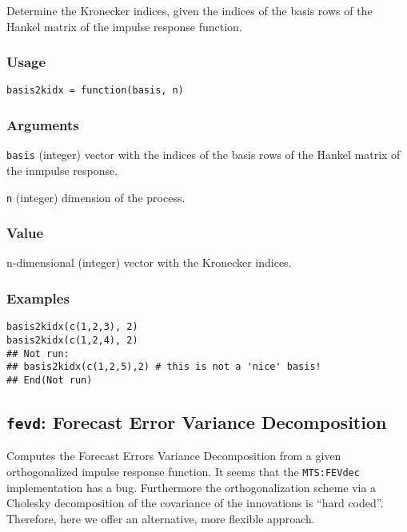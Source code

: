 \documentclass[]{article}
\begin{document}
Determine the Kronecker indices, given the indices of the basis rows of
the Hankel matrix of the impulse response function.

\subsubsection*{Usage}\begin{verbatim}
basis2kidx = function(basis, n)
\end{verbatim}\subsubsection*{Arguments}\begin{description}
\item \texttt{basis} (integer) vector with the indices of the basis rows of the
                      Hankel matrix of the inmpulse response.
\item \texttt{n} (integer) dimension of the process.
\end{description}\subsubsection*{Value}

n-dimensional (integer) vector with the Kronecker indices.
\subsubsection*{Examples}

\begin{verbatim}
basis2kidx(c(1,2,3), 2)
basis2kidx(c(1,2,4), 2)
## Not run: 
## basis2kidx(c(1,2,5),2) # this is not a 'nice' basis!
## End(Not run)
\end{verbatim}

\subsection{\texorpdfstring{\texttt{fevd}: Forecast Error Variance
Decomposition}{fevd: Forecast Error Variance Decomposition}}\label{fevd-forecast-error-variance-decomposition}

Computes the Forecast Errors Variance Decomposition from a given
orthogonalized impulse response function. It seems that the
\texttt{MTS:FEVdec} implementation has a bug. Furthermore the
orthogonalization scheme via a Cholesky decomposition of the covariance
of the innovations is ``hard coded''. Therefore, here we offer an
alternative, more flexible approach.
\end{document}
